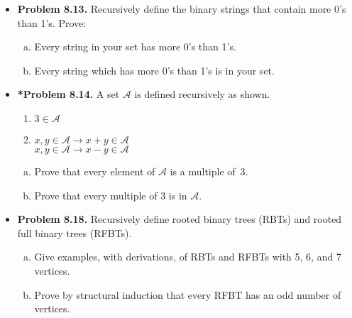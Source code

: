 \documentclass[11pt]{article}
\def\imp{\rightarrow}
\begin{document}
\begin{itemize}
\vspace{0.1in}

\item \textbf{Problem 8.13.}
Recursively define the binary strings that contain more 0's than 1's.
Prove:
\begin{enumerate}[(a)]
\item Every string in your set has more 0's than 1's.
\item Every string which has more 0's than 1's is in your set.
\end{enumerate}

\vspace{0.1in}

\item \textbf{*Problem 8.14.}
A set $\mathcal{A}$ is defined recursively as shown.
\begin{enumerate}[(1)]
\item $3\in\mathcal{A}$
\item $x,y\in\mathcal{A}\imp x+y\in\mathcal{A}$ \\
  $x,y\in\mathcal{A}\imp x-y\in\mathcal{A}$
\end{enumerate}
\begin{enumerate}[(a)]
\item Prove that every element of $\mathcal{A}$ is a multiple of~3.
\item Prove that every multiple of 3 is in $\mathcal{A}$.
\end{enumerate}

\vspace{0.1in}

\item \textbf{Problem 8.18.}
Recursively define rooted binary trees (RBTs) and rooted full binary trees (RFBTs).
\begin{enumerate}[(a)]
\item Give examples, with derivations, of RBTs and RFBTs with 5, 6, and 7 vertices.
\item Prove by structural induction that every RFBT has an odd number of vertices.
\end{enumerate}

\end{itemize}
\end{document}
